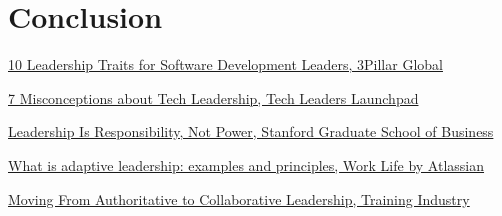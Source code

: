 \documentclass[runningheads]{llncs}
\begin{document}
\section{Conclusion}

%
%
%
% 
% 
%
\begin{thebibliography}{10}


\href{https://www.3pillarglobal.com/insights/10-leadership-traits-for-modern-software-development-leaders/}{10 Leadership Traits for Software Development Leaders, 3Pillar Global}

\href{https://techleaderslaunchpad.com/blog/7-misconceptions-about-tech-leadership}{7 Misconceptions about Tech Leadership, Tech Leaders Launchpad}

\href{https://www.gsb.stanford.edu/insights/leadership-responsibility-not-power}{Leadership Is Responsibility, Not Power, Stanford Graduate School of Business}

\href{https://www.atlassian.com/blog/leadership/adaptive-leadership}{What is adaptive leadership: examples and principles, Work Life by Atlassian}

\href{https://trainingindustry.com/articles/leadership/moving-from-authoritative-to-collaborative-leadership-benefits-and-best-practices-to-consider/#:~:text=1}{Moving From Authoritative to Collaborative Leadership, Training Industry}


\end{thebibliography}
\end{document}
